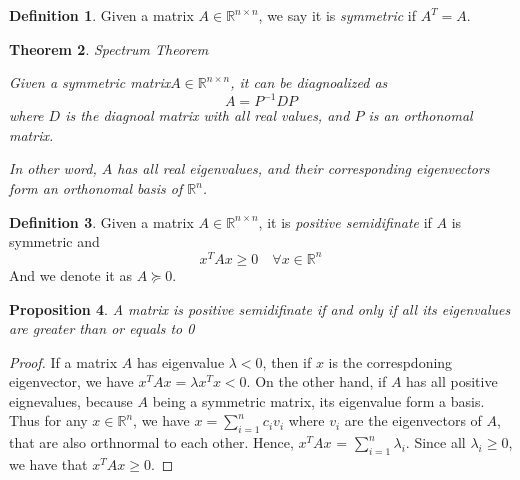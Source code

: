\documentclass[12pt]{amsart}
\numberwithin{equation}{section}
\newtheorem{thm}{Theorem}
\newtheorem{prop}[thm]{Proposition}
\theoremstyle{definition}
\newtheorem{definition}[thm]{Definition}
\numberwithin{thm}{section}
\begin{document}
\begin{definition}
     Given a matrix $A \in \mathbb{R}^{n \times n}$, we say it is \emph{symmetric} if $A^T = A$.
\end{definition}


\begin{thm} Spectrum Theorem

     Given a symmetric matrix$A \in \mathbb{R}^{n \times n}$, it can be diagnoalized as \begin{equation} A = P^{-1}DP \end{equation} where $D$ is the diagnoal matrix with all real values, and $P$ is an orthonomal matrix.
     
     In other word, $A$ has all real eigenvalues, and their corresponding eigenvectors form an orthonomal basis of $\mathbb{R}^n$. \cite{golub1996matrix}
     
\end{thm} 


\begin{definition}
     Given a matrix $A \in \mathbb{R}^{n \times n}$, it is \emph{positive semidifinate} if $A$ is symmetric and \begin{equation}
          x^T A x \geq 0 \quad \forall x \in \mathbb{R}^n
     \end{equation}
     And we denote it as $A \succcurlyeq 0$.
\end{definition}

\begin{prop}
     A matrix is \emph{positive semidifinate} if and only if all its eigenvalues are greater than or equals to 0
\end{prop}

\begin{proof}
     If a matrix $A$ has eigenvalue $\lambda < 0$, then if $x$ is the correspdoning eigenvector, we have $x^T A x = \lambda x^T x < 0$.
     On the other hand, if $A$ has all positive eignevalues, because $A$ being a symmetric matrix, its eigenvalue form a basis. Thus for any $x \in \mathbb{R}^n$, we have
     $x = \sum_{i = 1} ^ n c_i v_i $ where $v_i$ are the eigenvectors of $A$, that are also orthnormal to each other.
     Hence, $x^T A x$ = $\sum_{i = 1} ^ n \lambda_i$. Since all $\lambda_i \geq 0$, we have that $x ^ T A x \geq 0$.

\end{proof}
\end{document}
